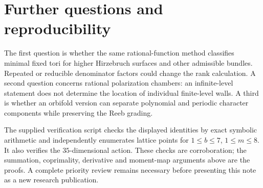 \documentclass[12pt]{amsart}
\theoremstyle{definition}
\theoremstyle{remark}
\numberwithin{equation}{section}
\begin{document}
\section{Further questions and reproducibility}
The first question is whether the same rational-function method classifies minimal fixed tori for higher Hirzebruch surfaces and other admissible bundles. Repeated or reducible denominator factors could change the rank calculation. A second question concerns rational polarization chambers: an infinite-level statement does not determine the location of individual finite-level walls. A third is whether an orbifold version can separate polynomial and periodic character components while preserving the Reeb grading.

The supplied verification script checks the displayed identities by exact symbolic arithmetic and independently enumerates lattice points for $1\leq b\leq7$, $1\leq m\leq8$. It also verifies the $35$-dimensional action. These checks are corroboration; the summation, coprimality, derivative and moment-map arguments above are the proofs. A complete priority review remains necessary before presenting this note as a new research publication.
\end{document}
